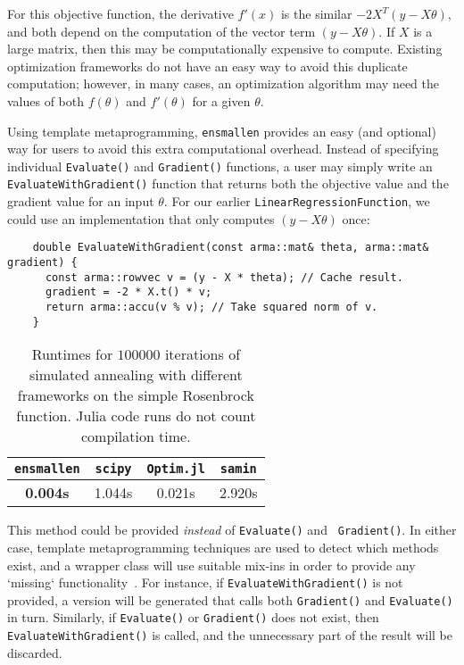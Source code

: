 \documentclass{article}
\begin{document}
For this objective function, the derivative $f'(x)$ is the similar $-2 X^T (y -
X \theta)$, and both depend on the computation of the vector term $(y - X
\theta)$.  If $X$ is a large matrix, then this may be computationally expensive
to compute.  Existing optimization frameworks do not have an easy way to avoid
this duplicate computation; however, in many cases, an optimization algorithm
may need the values of both $f(\theta)$ and $f'(\theta)$ for a given $\theta$.

Using template metaprogramming, {\tt ensmallen} provides an easy (and
optional) way for users to avoid this extra computational overhead.  Instead of
specifying individual {\tt Evaluate()} and {\tt Gradient()} functions, a user
may simply write an {\tt EvaluateWithGradient()} function that returns both the
objective value and the gradient value for an input $\theta$.  For our earlier
\texttt{LinearRegressionFunction}, we could use an implementation that only
computes $(y - X \theta)$ once:

\vspace*{-0.5em}
\begin{verbatim}
    double EvaluateWithGradient(const arma::mat& theta, arma::mat& gradient) {
      const arma::rowvec v = (y - X * theta); // Cache result.
      gradient = -2 * X.t() * v;
      return arma::accu(v % v); // Take squared norm of v.
    }
\end{verbatim}
\vspace*{-0.5em}

\begin{table}[t]
\begin{center}
\begin{tabular}{cccc}
\toprule
{\tt ensmallen} & {\tt scipy} & {\tt Optim.jl} & {\tt samin} \\
\midrule
{\bf 0.004s} & 1.044s & 0.021s & 2.920s \\
\bottomrule
\end{tabular}
\end{center}
\caption{Runtimes for $100000$ iterations of simulated annealing with different
frameworks on the simple Rosenbrock function.  Julia code runs do not count
compilation time.}
\label{tab:rosenbrock_results}
\end{table}

This method could be provided {\it instead} of {\tt Evaluate()} and {\tt
Gradient()}.  In either case, template metaprogramming techniques are used to
detect which methods exist, and a wrapper class will use suitable mix-ins in
order to provide any `missing` functionality~\cite{smaragdakis2000mixin}.  For
instance, if {\tt EvaluateWithGradient()} is not provided, a version will be
generated that calls both {\tt Gradient()} and {\tt Evaluate()} in turn.
Similarly, if {\tt Evaluate()} or {\tt Gradient()} does not exist, then {\tt
EvaluateWithGradient()} is called, and the unnecessary part of the result will
be discarded.
\end{document}
